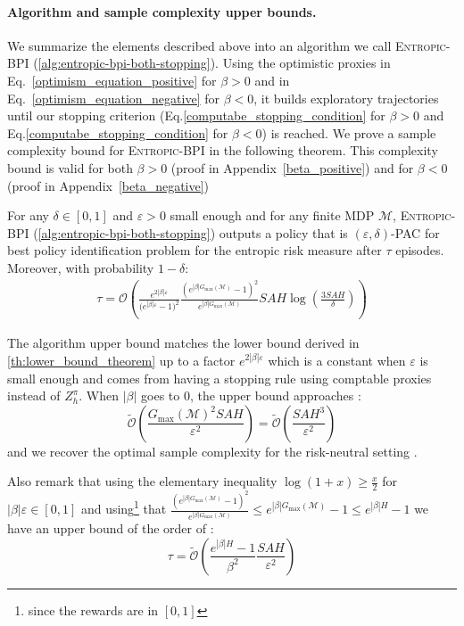 \documentclass[final,12pt]{colt2026} %
\begin{document}
\paragraph{Algorithm and sample complexity upper bounds. } We summarize the elements described above into an algorithm we call \textsc{Entropic-BPI} (\cref{alg:entropic-bpi-both-stopping}). Using the optimistic proxies in Eq.~\eqref{optimism_equation_positive} for $\beta>0$ and in Eq.~\eqref{optimism_equation_negative} for $\beta <0$, it builds exploratory trajectories until our stopping criterion (Eq.\ref{computabe_stopping_condition} for $\beta >0$ and Eq.\eqref{computabe_stopping_condition} for $\beta<0$) is reached. We prove a sample complexity bound for \textsc{Entropic-BPI} in the following theorem. This complexity bound is valid for both $\beta > 0$ (proof in Appendix~\ref{beta_positive}) and for $\beta < 0$ (proof in Appendix~\ref{beta_negative})
\begin{theorem}\label{th:upper_bound}
For any $\delta \in [0,1]$ and $\varepsilon > 0$ small enough and for any finite MDP $\mathcal{M}$, \textsc{Entropic-BPI} (\cref{alg:entropic-bpi-both-stopping}) outputs a policy that is $(\varepsilon,\delta)$-PAC for best policy identification problem for the entropic risk measure after $\tau$ episodes. Moreover, with probability $1 - \delta$:
\begin{align*}
\tau = \mathcal{O}\left( \frac{e^{2|\beta|\varepsilon}}{\big(e^{|\beta| \varepsilon} - 1\big)^2}\frac{(e^{|\beta| G_{\text{max}}(\mathcal{M})} - 1)^2}{e^{|\beta| G_{\text{max}}(\mathcal{M})}} SAH  \log(\frac{3SAH}{\delta})\right)
\end{align*}
\end{theorem}
The algorithm upper bound matches the lower bound derived in \cref{th:lower_bound_theorem} up to a factor $e^{2 |\beta| \varepsilon}$ which is a constant when $\varepsilon$ is small enough and comes from having a stopping rule using comptable proxies instead of $Z_h^\pi$.
When $|\beta|$ goes to $0$, the upper bound approaches :
$$\tilde{\mathcal{O}}\left(\frac{G_{\text{max}}(\mathcal{M})^2 SAH}{\varepsilon^2}\right)= \tilde{\mathcal{O}}\left(\frac{SAH^3}{\varepsilon^2}\right)$$
and we recover the optimal sample complexity for the risk-neutral setting \citep{Menard2021Fast}.

Also remark that using the elementary inequality $\log(1 + x) \geq \frac{x}{2}$ for $|\beta| \varepsilon \in [0,1]$ and using\footnote{since the rewards are in $[0,1]$} that $\frac{(e^{|\beta| G_{\text{max}}(\mathcal{M})} - 1)^2}{e^{|\beta| G_{\text{max}}(\mathcal{M})}} \leq e^{|\beta| G_{\text{max}}(\mathcal{M})} -1 \leq e^{|\beta| H} - 1$  we have an upper bound of the order of :
$$\tau = \tilde{\mathcal{O}}\left( \frac{e^{|\beta| H} - 1}{\beta^2}\frac{SAH}{\varepsilon^2}  \right)$$
\end{document}
